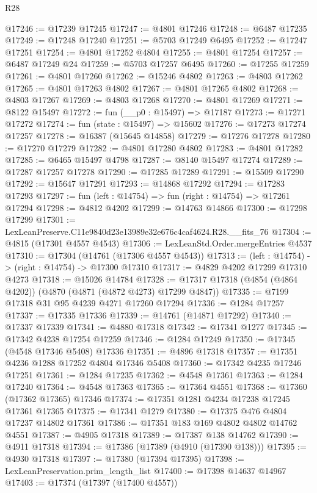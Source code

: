 \begin{lexlean}{R28}
\begin{coremodule}
@17246 := @17239 @17245
@17247 := @4801 @17246
@17248 := @6487 @17235
@17249 := @17248 @17240
@17251 := @5703 @17249 @6495
@17252 := @17247 @17251
@17254 := @4801 @17252 @4804
@17255 := @4801 @17254
@17257 := @6487 @17249 @24
@17259 := @5703 @17257 @6495
@17260 := @17255 @17259
@17261 := @4801 @17260
@17262 := @15246 @4802
@17263 := @4803 @17262
@17265 := @4801 @17263 @4802
@17267 := @4801 @17265 @4802
@17268 := @4803 @17267
@17269 := @4803 @17268
@17270 := @4801 @17269
@17271 := @8122 @15497
@17272 := fun (__p0 : @15497) => @17187
@17273 := @17271 @17272
@17274 := fun (state : @15497) => @15602
@17276 := @17273 @17274 @17257
@17278 := @16387 (@15645 @14858)
@17279 := @17276 @17278
@17280 := @17270 @17279
@17282 := @4801 @17280 @4802
@17283 := @4801 @17282
@17285 := @6465 @15497 @4798
@17287 := @8140 @15497 @17274
@17289 := @17287 @17257 @17278
@17290 := @17285 @17289
@17291 := @15509 @17290
@17292 := @15647 @17291
@17293 := @14868 @17292
@17294 := @17283 @17293
@17297 := fun (left : @14754) => fun (right : @14754) => @17261 @17294
@17298 := @4812 @4202
@17299 := @14763 @14866
@17300 := @17298 @17299
@17301 := LexLeanPreserve.C11e9840d23e13989e32e676c4caf4624.R28.__fits_76
@17304 := @4815 (@17301 @4557 @4543)
@17306 := LexLeanStd.Order.mergeEntries @4537
@17310 := @17304 (@14761 (@17306 @4557 @4543))
@17313 := (left : @14754) -> (right : @14754) -> @17300 @17310
@17317 := @4829 @4202 @17299 @17310 @4273
@17318 := @15026 @14784
@17328 := @17317 @17318 (@4854 (@4864 @4202)) (@4870 (@4871 (@4872 @4273) @17299 @4847))
@17335 := @7199 @17318 @31 @95 @4239 @4271 @17260 @17294
@17336 := @1284 @17257
@17337 := @17335 @17336
@17339 := @14761 (@14871 @17292)
@17340 := @17337 @17339
@17341 := @4880 @17318
@17342 := @17341 @1277
@17345 := @17342 @4238 @17254 @17259
@17346 := @1284 @17249
@17350 := @17345 (@4548 @17346 @5408) @17336
@17351 := @4896 @17318
@17357 := @17351 @4236 @1288 @17252 @4804 @17346 @5408
@17360 := @17342 @4235 @17246 @17251
@17361 := @1284 @17235
@17362 := @4548 @17361
@17363 := @1284 @17240
@17364 := @4548 @17363
@17365 := @17364 @4551
@17368 := @17360 (@17362 @17365) @17346
@17374 := @17351 @1281 @4234 @17238 @17245 @17361 @17365
@17375 := @17341 @1279
@17380 := @17375 @476 @4804 @17237 @14802 @17361
@17386 := @17351 @183 @169 @4802 @4802 @14762 @4551
@17387 := @4905 @17318
@17389 := @17387 @138 @14762
@17390 := @4911 @17318
@17394 := @17386 (@17389 (@4910 (@17390 @138)))
@17395 := @4930 @17318
@17397 := @17380 (@17394 @17395)
@17398 := LexLeanPreservation.prim_length_list
@17400 := @17398 @14637 @14967
@17403 := @17374 (@17397 (@17400 @4557))

\end{coremodule}
\end{lexlean}
